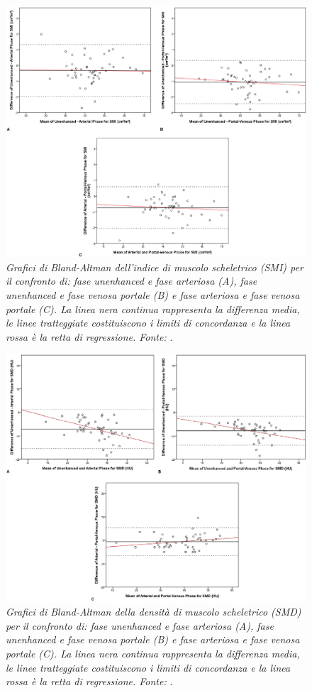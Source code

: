\begin{figure}[htp]
\centering
\includegraphics[scale=0.77]{Immagini/vanVugt_smiba.png}
\caption{\label{fig:vanVugt_smiba} \textit{Grafici di Bland-Altman dell'indice di muscolo scheletrico (SMI) per il confronto di: fase unenhanced e fase arteriosa (A), fase unenhanced e fase venosa portale (B) e fase arteriosa e fase venosa portale (C). La linea nera continua rappresenta la differenza media, le linee tratteggiate costituiscono i limiti di concordanza e la linea rossa è la retta di regressione. Fonte:} \cite{vanVugt2018}.}
\end{figure}
\begin{figure}[htp]
\centering
\includegraphics[scale=0.77]{Immagini/vanVugt_smdba.png}
\caption{\label{fig:vanVugt_smdba} \textit{Grafici di Bland-Altman della densità di muscolo scheletrico (SMD) per il confronto di: fase unenhanced e fase arteriosa (A), fase unenhanced e fase venosa portale (B) e fase arteriosa e fase venosa portale (C). La linea nera continua rappresenta la differenza media, le linee tratteggiate costituiscono i limiti di concordanza e la linea rossa è la retta di regressione. Fonte:} \cite{vanVugt2018}.}
\end{figure}

